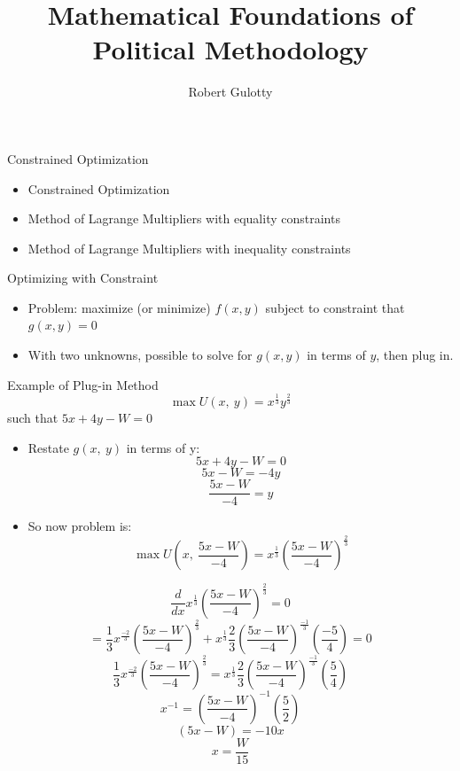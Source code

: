 \documentclass{beamer}
\title[PLSC 43401] %
{Mathematical Foundations of Political Methodology}
\author{Robert Gulotty}
\institute[University of Chicago]{Professor\\Department of Political Science \\  University of Chicago}
\numberwithin{equation}{section}
\begin{document}
\begin{frame}
\titlepage
\end{frame}



\begin{frame}{Constrained Optimization}

\begin{itemize}
\item Constrained Optimization
\item Method of Lagrange Multipliers with equality constraints
\item Method of Lagrange Multipliers with inequality constraints
\end{itemize}
\end{frame}


\begin{frame}{Optimizing with Constraint}

\begin{itemize}
\item Problem: maximize (or minimize) $f(x,y)$ subject to constraint that $g(x,y)=0$
\item With two unknowns, possible to solve for $g(x,y)$ in terms of $y$, then plug in. 
\end{itemize}
\end{frame}

\begin{frame}{Example of Plug-in Method}
$$\max U(x,\ y)=x^{\frac{1}{3}}y^{\frac{2}{3}}$$
such that $5x+4y-W=0$\pause
\begin{itemize}
\item Restate $g(x,\ y)$ in terms of y:\pause
$$5x+4y-W=0$$\pause
$$5x-W=-4y$$\pause
$$\frac{5x-W}{-4}=y$$\pause
\item So now problem is:\pause
$$\max U(x,\ \frac{5x-W}{-4})= x^{\frac{1}{3}}\left(\frac{5x-W}{-4}\right)^{\frac{2}{3}}$$
\end{itemize}


\end{frame}


\begin{frame}
$$\frac{d}{dx} x^{\frac{1}{3}}\left(\frac{5x-W}{-4}\right)^{\frac{2}{3}}=0$$\pause
$$=\frac{1}{3}x^{\frac{-2}{3}}\left(\frac{5x-W}{-4}\right)^{\frac{2}{3}}+x^{\frac{1}{3}}\frac{2}{3}\left(\frac{5x-W}{-4}\right)^{\frac{-1}{3}}(\frac{-5}{4})=0$$\pause
$$\frac{1}{3}x^{\frac{-2}{3}}\left(\frac{5x-W}{-4}\right)^{\frac{2}{3}}=x^{\frac{1}{3}}\frac{2}{3}\left(\frac{5x-W}{-4}\right)^{\frac{-1}{3}}(\frac{5}{4})$$\pause
$$x^{-1}=\left(\frac{5x-W}{-4}\right)^{-1}(\frac{5}{2})$$\pause
$$\left(5x-W\right)=-10x$$\pause
$$x=\frac{W}{15}$$
\end{frame}
\end{document}
